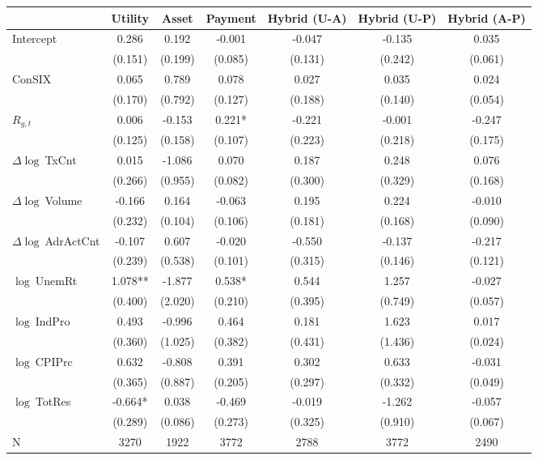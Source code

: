 \begin{table}[ht]
\centering
\scriptsize
\setlength{\tabcolsep}{4pt}
\begin{tabular}{l *{6}{c}}
\toprule
 & Utility & Asset & Payment & Hybrid (U-A) & Hybrid (U-P) & Hybrid (A-P) \\
\midrule
Intercept & 0.286 & 0.192 & -0.001 & -0.047 & -0.135 & 0.035 \\
 & (0.151) & (0.199) & (0.085) & (0.131) & (0.242) & (0.061) \\
\addlinespace
ConSIX & 0.065 & 0.789 & 0.078 & 0.027 & 0.035 & 0.024 \\
 & (0.170) & (0.792) & (0.127) & (0.188) & (0.140) & (0.054) \\
\addlinespace
$R_{g,t}$ & 0.006 & -0.153 & 0.221* & -0.221 & -0.001 & -0.247 \\
 & (0.125) & (0.158) & (0.107) & (0.223) & (0.218) & (0.175) \\
\addlinespace
$\Delta\log\ $TxCnt & 0.015 & -1.086 & 0.070 & 0.187 & 0.248 & 0.076 \\
 & (0.266) & (0.955) & (0.082) & (0.300) & (0.329) & (0.168) \\
\addlinespace
$\Delta\log\ $Volume & -0.166 & 0.164 & -0.063 & 0.195 & 0.224 & -0.010 \\
 & (0.232) & (0.104) & (0.106) & (0.181) & (0.168) & (0.090) \\
\addlinespace
$\Delta\log\ $AdrActCnt & -0.107 & 0.607 & -0.020 & -0.550 & -0.137 & -0.217 \\
 & (0.239) & (0.538) & (0.101) & (0.315) & (0.146) & (0.121) \\
\addlinespace
$\log\ $UnemRt & 1.078** & -1.877 & 0.538* & 0.544 & 1.257 & -0.027 \\
 & (0.400) & (2.020) & (0.210) & (0.395) & (0.749) & (0.057) \\
\addlinespace
$\log\ $IndPro & 0.493 & -0.996 & 0.464 & 0.181 & 1.623 & 0.017 \\
 & (0.360) & (1.025) & (0.382) & (0.431) & (1.436) & (0.024) \\
\addlinespace
$\log\ $CPIPrc & 0.632 & -0.808 & 0.391 & 0.302 & 0.633 & -0.031 \\
 & (0.365) & (0.887) & (0.205) & (0.297) & (0.332) & (0.049) \\
\addlinespace
$\log\ $TotRes & -0.664* & 0.038 & -0.469 & -0.019 & -1.262 & -0.057 \\
 & (0.289) & (0.086) & (0.273) & (0.325) & (0.910) & (0.067) \\
\addlinespace
\midrule
N & 3270 & 1922 & 3772 & 2788 & 3772 & 2490 \\

\end{tabular}
\end{table}
